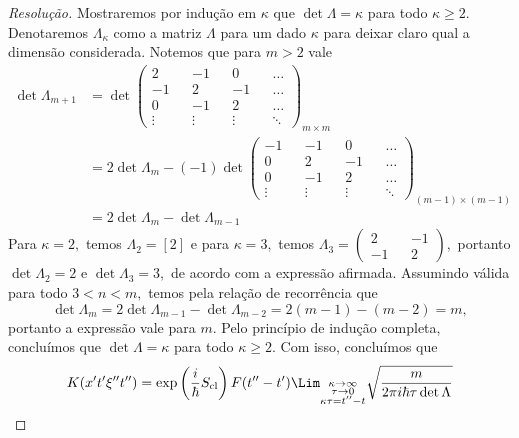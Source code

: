 \begin{proof}[Resolução]
   Mostraremos por indução em \(\kappa\) que \(\det{\Lambda} = \kappa\) para todo \(\kappa \geq 2\). Denotaremos \(\Lambda_{\kappa}\) como a matriz \(\Lambda\) para um dado \(\kappa\) para deixar claro qual a dimensão considerada. Notemos que para \(m > 2\) vale
   \begin{align*}
      \det \Lambda_{m + 1} &= \det \begin{pmatrix}
         2 && -1 && 0 && \dots\\
         -1 && 2 && -1 && \dots\\
         0 && -1 && 2 && \dots\\
         \vdots && \vdots && \vdots && \ddots
      \end{pmatrix}_{m \times m}\\
                           &= 2 \det \Lambda_m - (-1) \det \begin{pmatrix}
                              -1 && -1 && 0 && \dots\\
                              0 && 2 && -1 && \dots\\
                              0 && -1 && 2 && \dots\\
                              \vdots && \vdots && \vdots && \ddots
                           \end{pmatrix}_{(m-1) \times (m-1)}\\
                           &= 2\det \Lambda_m - \det \Lambda_{m -1}
      \end{align*}
      Para \(\kappa = 2,\) temos \(\Lambda_2 = [2]\) e para \(\kappa = 3,\) temos \(\Lambda_3 = \left(\begin{smallmatrix}
            2 && -1\\
            -1 && 2
      \end{smallmatrix}\right),\) portanto \(\det{\Lambda_2} = 2\) e \(\det{\Lambda_3} = 3,\) de acordo com a expressão afirmada. Assumindo válida para todo \(3 < n < m,\) temos pela relação de recorrência que
      \begin{equation*}
         \det \Lambda_{m} = 2 \det{\Lambda_{m - 1}} - \det{\Lambda_{m - 2}} = 2(m - 1) - (m - 2) = m,
      \end{equation*}
      portanto a expressão vale para \(m.\) Pelo princípio de indução completa, concluímos que \(\det \Lambda = \kappa\) para todo \(\kappa \geq 2.\) Com isso, concluímos que
      \begin{align*}
         K(x't'\xi''t'') &= \exp\left(\frac{i}{\hbar} S_{\mathrm{cl}}\right)F(t'' - t') \Lim_{\substack{\kappa \to \infty\\ \tau \to 0\\ \kappa \tau = t'' - t}}{\sqrt{\frac{m}{2\pi i \hbar \tau \det \Lambda}}}\\

\end{align*}
\end{proof}
